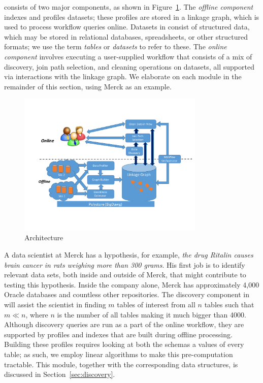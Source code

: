\dcv consists of two major components, as shown in 
Figure~\ref{fig:arch}.  
The {\it offline component} indexes and profiles datasets;  these profiles are stored  in a linkage graph, which is used to process workflow queries online. 
Datasets in \dcv consist of structured data, which may be stored in relational databases, spreadsheets, or other structured formats; we use the term {\it tables} or {\it datasets} to refer to these.
 The {\it online component} involves executing a user-supplied workflow that consists of a mix of discovery, join path selection, and cleaning operations on datasets, all supported via interactions with the linkage graph. We elaborate on each module in the remainder of this section, using Merck as an example.


\begin{figure}[!t]
\includegraphics[width=3.5in]{arch3.pdf}
\caption{\dcv Architecture}
\label{fig:arch}
\end{figure}


\stitle{[Discovery.]} 
A data scientist at Merck has a hypothesis, for example, {\it the drug Ritalin causes brain cancer in rats weighing more than 300 grams}.
His first job is to identify relevant data sets, both inside and outside of Merck, that might contribute to testing this hypothesis. Inside the company alone, Merck has approximately 4,000 Oracle databases and countless other repositories. The discovery component in \dcv will assist the scientist in finding $m$ tables of interest from all $n$ tables such that $m \ll n$, where $n$ is the number of all tables making it much bigger than 4000.  
%
Although discovery queries are run as a part of the online workflow, they are supported by profiles and indexes that are built during offline processing.  Building these profiles requires looking at both the schemas a values of every table; 
as such, we employ linear algorithms to make this pre-computation tractable.
%
This module, together with the corresponding data structures, is discussed in Section~\ref{sec:discovery}.

